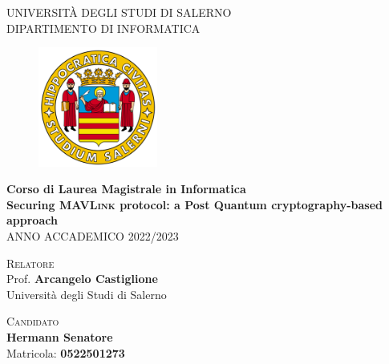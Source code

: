 \documentclass[a4paper, 12pt, oneside]{article}
\theoremstyle{definition}
\begin{document}
\begin{titlepage}
    \begin{center}
        \LARGE{\uppercase{Università degli Studi di Salerno}}\\
        \vspace{5mm}
    	\uppercase{\normalsize Dipartimento di Informatica }\\
    \end{center}
    \begin{figure}[H]
        \centering
        \includegraphics[width=0.35\textwidth]{logo_unisa}
    \end{figure}
    
    \begin{center}
        \normalsize{\textbf{Corso di Laurea Magistrale in Informatica}}\\
    	\vspace{10mm}
    	\LARGE{\textbf{Securing \textsc{MAVLink} protocol: a Post Quantum cryptography-based approach}}\\
    	\vspace{3mm}
        \large{\uppercase{Anno Accademico 2022/2023}}
    \end{center}

    \vspace{50mm}
    \noindent
    \begin{minipage}[t]{0.4\textwidth}
    	\textsc{Relatore}\\Prof. \textbf{Arcangelo Castiglione}\\
        \small Università degli Studi di Salerno
    	\vspace{12mm}\\
    \end{minipage}
    \hfill
    \begin{minipage}[t]{0.4\textwidth}\raggedleft
    	\textsc{Candidato} \\\textbf{Hermann Senatore}\\\small Matricola: \textbf{0522501273}
    \end{minipage}
\end{titlepage}
\newpage
\end{document}
